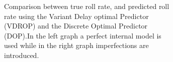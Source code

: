 \begin{figure}
    \centering
    \begin{subfigure}[b]{\textwidth}
        \caption{Comparison between true roll rate, and predicted roll rate using the Variant Delay optimal Predictor (VDROP) and the  Discrete Optimal Predictor (DOP).In the left graph a perfect internal model is used while in the right graph imperfections are introduced.}
        \label{fig:predictor_compare}
    \end{subfigure}
    \begin{subfigure}[b]{\textwidth}
        \centering

\end{subfigure}
\end{figure}
